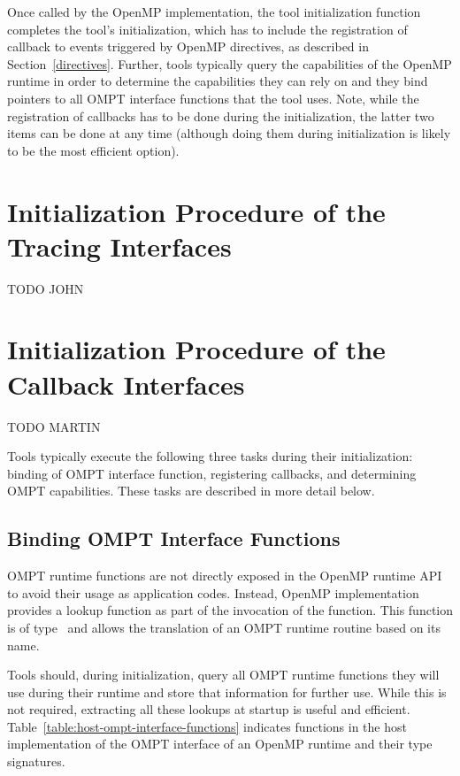 Once called by the OpenMP implementation, the tool initialization function completes
the tool's initialization, which has to include the registration of callback to events triggered
by OpenMP directives, as described in Section~\ref{directives}. Further, tools typically
query the capabilities of the OpenMP runtime in order to determine the capabilities they can
rely on and they bind pointers to all OMPT interface functions that the tool uses. Note,
while the registration of callbacks has to be done during the initialization, the latter two items
can be done at any time (although doing them during initialization is likely to be the most
efficient option). 


\section{Initialization Procedure of the Tracing Interfaces}
\label{sec:tool-trace-initialize-tasks}

TODO JOHN

\section{Initialization Procedure of the Callback Interfaces}
\label{sec:tool-cb-initialize-tasks}

TODO MARTIN

Tools typically execute the following three tasks during their initialization: binding of OMPT interface function, registering callbacks, and determining OMPT capabilities. These tasks are described in more detail below.

\subsection{Binding OMPT Interface Functions}
\label{sec:ToolsSupport_bind}

OMPT runtime functions are not directly exposed in the OpenMP runtime API to avoid their usage as application codes. Instead, OpenMP implementation provides a lookup function as part of the invocation of the  function. This function is of
type~ and allows the translation of an OMPT runtime routine based on its name.

Tools should, during initialization, query all OMPT runtime functions they will use during their runtime and store that information for further use. While this is not required, extracting all these lookups at startup is useful and efficient.
Table~\ref{table:host-ompt-interface-functions} 
indicates functions in the host implementation of the 
OMPT interface of an OpenMP runtime and their
type signatures.


